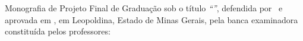 \begin{folhadeaprovacao}
    
    Monografia de Projeto Final de Graduação sob o título
    \textit{``\ABNTtitulodata''}, defendida por \ABNTautordata~e aprovada em
    \ABNTdatadata, em Leopoldina, Estado de Minas Gerais, pela banca examinadora
    constituída pelos professores: \setlength{\ABNTsignthickness}{0.4pt}
    

\end{folhadeaprovacao}
